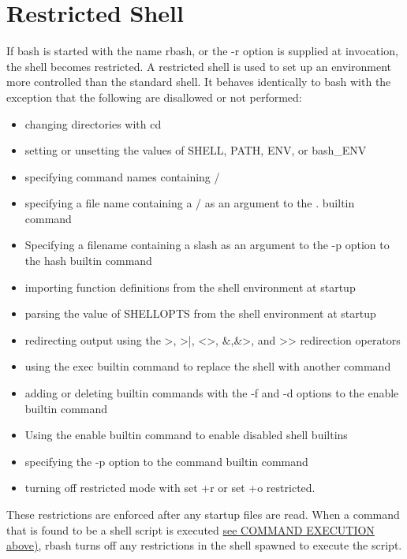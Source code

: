 \section{Restricted Shell}\label{sec:restrictedshell}
    If bash is started with the name rbash, or the -r option is supplied at invocation, the shell becomes restricted. A restricted shell is used to set up an environment more controlled than the standard shell. It behaves identically to bash with the exception that the following are disallowed or not performed:
    
    \begin{itemize}
        \item  changing directories with cd
        \item  setting or unsetting the values of SHELL, PATH, ENV, or bash\_ENV
        \item  specifying command names containing /
        \item  specifying a file name containing a / as an argument to the . builtin command
        \item  Specifying a filename containing a slash as an argument to the -p option to the hash builtin command
        \item  importing function definitions from the shell environment at startup
        \item  parsing the value of SHELLOPTS from the shell environment at startup
        \item  redirecting output using the >, >|, <>, \&,\&>, and >> redirection operators
        \item  using the exec builtin command to replace the shell with another command
        \item  adding or deleting builtin commands with the -f and -d options to the enable builtin command
        \item  Using the enable builtin command to enable disabled shell builtins
        \item  specifying the -p option to the command builtin command
        \item  turning off restricted mode with set +r or set +o restricted.
    \end{itemize}
    These restrictions are enforced after any startup files are read.
    When a command that is found to be a shell script is executed \hyperref[sec:commandexecution]{see COMMAND EXECUTION above)}, rbash turns off any restrictions in the shell spawned to execute the script.